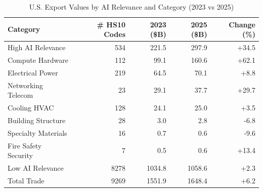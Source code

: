 \begin{table}[htbp]
\centering
\caption{U.S. Export Values by AI Relevance and Category (2023 vs 2025)}
\label{tab:trade_hierarchical_exports}
\setlength{\tabcolsep}{4.5mm}
\renewcommand{\arraystretch}{1.60}
\begin{tabular}{lrrrr}
\toprule
Category & \# HS10 Codes & 2023 (\$B) & 2025 (\$B) & Change (\%) \\
\midrule
High AI Relevance & 534 & 221.5 & 297.9 & +34.5 \\
\quad\quad Compute Hardware & 112 & 99.1 & 160.6 & +62.1 \\
\quad\quad Electrical Power & 219 & 64.5 & 70.1 & +8.8 \\
\quad\quad Networking Telecom & 23 & 29.1 & 37.7 & +29.7 \\
\quad\quad Cooling HVAC & 128 & 24.1 & 25.0 & +3.5 \\
\quad\quad Building Structure & 28 & 3.0 & 2.8 & -6.8 \\
\quad\quad Specialty Materials & 16 & 0.7 & 0.6 & -9.6 \\
\quad\quad Fire Safety Security & 7 & 0.5 & 0.6 & +13.4 \\
Low AI Relevance & 8278 & 1034.8 & 1058.6 & +2.3 \\
\midrule
Total Trade & 9269 & 1551.9 & 1648.4 & +6.2 \\
\bottomrule
\end{tabular}
\end{table}
